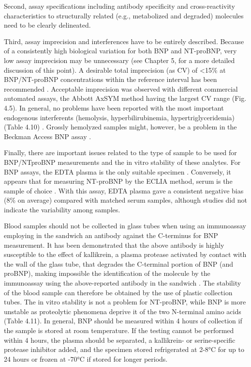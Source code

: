 \documentclass[14pt,a4paper,onecolumn]{extarticle}
\begin{document}
Second, assay specifications including antibody specificity and cross-reactivity characteristics to structurally related (e.g., metabolized and degraded) molecules need to be
clearly delineated.

Third, assay imprecision and interferences have to be entirely described. Because of
a consistently high biological variation for both BNP and NT-proBNP, very low assay
imprecision may be unnecessary (see Chapter 5, for a more detailed discussion of this point). A desirable total imprecision (as CV) of <15\% at BNP/NT-proBNP concentrations within the reference interval has been recommended \citep{bib288}. Acceptable imprecision was observed with different commercial automated assays, the Abbott
AxSYM method having the largest CV range (Fig. 4.5). In general, no problems have been
reported with the most important endogenous interferents (hemolysis, hyperbilirubinemia, hypertriglyceridemia) (Table 4.10) \citep{bib28} \citep{bib270} \citep{bib289} \citep{bib290} \citep{bib291} \citep{bib292}. Grossly hemolyzed samples
might, however, be a problem in the Beckman Access BNP assay \citep{bib290}.

Finally, there are important issues related to the type of sample to be used for BNP/NTproBNP measurements and the in vitro stability of these analytes. For BNP assays, the
EDTA plasma is the only suitable specimen \citep{bib293}. Conversely, it appears that for measuring NT-proBNP by the ECLIA method, serum is the sample of choice \citep{bib272}. With this
assay, EDTA plasma gave a consistent negative bias (8\% on average) compared with
matched serum samples, although studies did not indicate the variability among samples.

Blood samples should not be collected in glass tubes when using an immunoassay
employing in the sandwich an antibody against the C-terminus for BNP measurement.
It has been demonstrated that the above antibody is highly susceptible to the effect of
kallikrein, a plasma protease activated by contact with the wall of the glass tube, that
degrades the C-terminal portion of BNP (and proBNP), making impossible the identification of the molecule by the immunoassay using the above-reported antibody in the
sandwich \citep{bib282} \citep{bib283} \citep{bib294}. The stability of the blood sample can therefore be obtained by
the use of plastic collection tubes. The in vitro stability is not a problem for NT-proBNP, while BNP is more unstable as proteolytic phenomena deprive it of the two N-terminal amino acids (Table 4.11). In general, BNP should be measured within 4 hours of
collection if the sample is stored at room temperature. If the testing cannot be performed within 4 hours, the plasma should be separated, a kallikrein- or serine-specific protease inhibitor added, and the specimen stored refrigerated at 2-8°C for up to 24
hours or frozen at -70°C if stored for longer periods.
\end{document}
